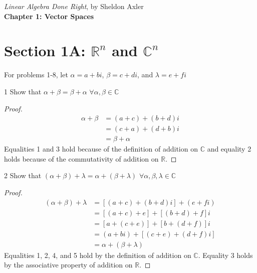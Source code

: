 \documentclass[12pt]{article}
\newenvironment{problem}[1]{\begin{prob*}{#1}{}}{\end{prob*}}
\newcommand{\R}{\mathbb{R}}
\newcommand{\C}{\mathbb{C}}
\begin{document}
\begin{center}
    \vspace*{1em}
    {\large \emph{Linear Algebra Done Right}, by Sheldon Axler} \\[0.5em]
    {\LARGE \bfseries Chapter 1: Vector Spaces} \\[0.3em]
    \vspace{1.5em}
\end{center}

\thispagestyle{plain} 


\section*{Section 1A: $\R^n$ and $\C^n$}

For problems 1-8, let $\alpha =a + bi$, $\beta = c+di$, and $\lambda = e+fi$ 

\begin{problem}{1}
Show that $\alpha + \beta =\beta + \alpha$ $\forall\alpha,\beta\in \mathbb{C}$
\end{problem}
\begin{proof}
    \begin{align*}
        \alpha + \beta &= (a+c)+(b+d)i \\
        &=(c+a)+(d+b)i \\
        &=\beta + \alpha
    \end{align*}
    Equalities 1 and 3 hold because of the definition of addition on $\mathbb{C}$ and equality 2 holds because of the commutativity of addition on $\mathbb{R}$.
\end{proof}

\begin{problem}{2}
Show that $(\alpha + \beta) + \lambda = \alpha + (\beta + \lambda)$ $\forall \alpha, \beta, \lambda \in \mathbb{C}$
\end{problem}
\begin{proof}
    \begin{align*}
        (\alpha + \beta) + \lambda &=[(a+c)+(b+d)i]+(e+fi)\\
        &=[(a+c)+e]+[(b+d)+f]i\\
        &=[a+(c+e)]+[b+(d+f)]i\\
        &=(a+bi)+[(c+e)+(d+f)i]\\
        &=\alpha + (\beta + \lambda)
    \end{align*}
    Equalities 1, 2, 4, and 5 hold by the definition of addition on $\mathbb{C}$. Equality 3 holds by the associative property of addition on $\mathbb{R}$.
\end{proof}
\end{document}
